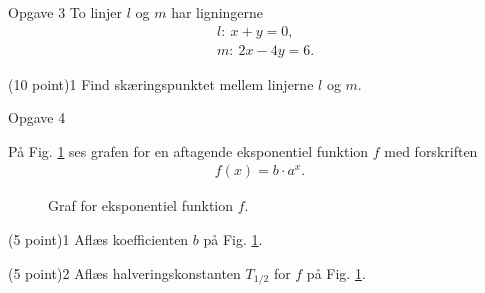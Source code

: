 \documentclass[12pt,x11names,a4paper]{article}
\begin{document}
\begin{opgavetekst}{Opgave 3}
To linjer $l$ og $m$ har ligningerne 
\begin{align*}
&l: \ x + y = 0,\\
&m: \ 2x-4y = 6.
\end{align*}
\end{opgavetekst}
\begin{delopgave}{(10 point)}{1}
Find skæringspunktet mellem linjerne $l$ og $m$. 
\end{delopgave}

\begin{opgavetekst}{Opgave 4}

På Fig. \ref{fig:eksp} ses grafen for en aftagende eksponentiel funktion $f$ med forskriften 
\begin{align*}
f(x) = b\cdot a^x.
\end{align*}
\begin{figure}[H]
 \centering
{}
\caption{Graf for eksponentiel funktion $f$.}
\label{fig:eksp}
\end{figure}\phantom{h}
\end{opgavetekst}
\begin{delopgave}{\colorbox{NorregGroen!40}{(5 point)}}{1}
Aflæs koefficienten $b$ på Fig. \ref{fig:eksp}. 
\end{delopgave}
\begin{delopgave}{(5 point)}{2}
Aflæs halveringskonstanten $T_{1/2}$ for $f$ på Fig. \ref{fig:eksp}.
\end{delopgave}
\end{document}
